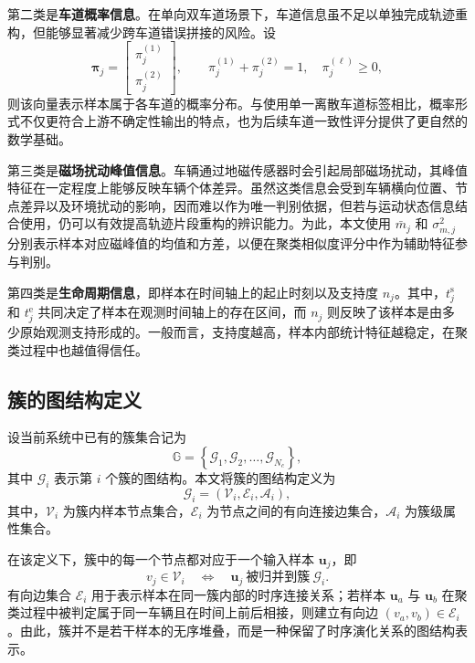 \documentclass{xdupgthesis}
\begin{document}
第二类是\textbf{车道概率信息}。在单向双车道场景下，车道信息虽不足以单独完成轨迹重构，但能够显著减少跨车道错误拼接的风险。设
\begin{equation}
	\boldsymbol{\pi}_j=
	\begin{bmatrix}
		\pi_j^{(1)}\\[2pt]
		\pi_j^{(2)}
	\end{bmatrix},
	\qquad
	\pi_j^{(1)}+\pi_j^{(2)}=1,\quad
	\pi_j^{(\ell)}\ge 0,
\end{equation}
则该向量表示样本属于各车道的概率分布。与使用单一离散车道标签相比，概率形式不仅更符合上游不确定性输出的特点，也为后续车道一致性评分提供了更自然的数学基础。

第三类是\textbf{磁场扰动峰值信息}。车辆通过地磁传感器时会引起局部磁场扰动，其峰值特征在一定程度上能够反映车辆个体差异。虽然这类信息会受到车辆横向位置、节点差异以及环境扰动的影响，因而难以作为唯一判别依据，但若与运动状态信息结合使用，仍可以有效提高轨迹片段重构的辨识能力。为此，本文使用 $\bar m_j$ 和 $\sigma_{m,j}^{2}$ 分别表示样本对应磁峰值的均值和方差，以便在聚类相似度评分中作为辅助特征参与判别。

第四类是\textbf{生命周期信息}，即样本在时间轴上的起止时刻以及支持度 $n_j$。其中，$t_j^{\mathrm{s}}$ 和 $t_j^{\mathrm{e}}$ 共同决定了样本在观测时间轴上的存在区间，而 $n_j$ 则反映了该样本是由多少原始观测支持形成的。一般而言，支持度越高，样本内部统计特征越稳定，在聚类过程中也越值得信任。

\subsection{簇的图结构定义}

设当前系统中已有的簇集合记为
\begin{equation}
	\mathbb{G}=\left\{\mathcal{G}_1,\mathcal{G}_2,\ldots,\mathcal{G}_{N_c}\right\},
\end{equation}
其中 $\mathcal{G}_i$ 表示第 $i$ 个簇的图结构。本文将簇的图结构定义为
\begin{equation}
	\mathcal{G}_i = \left(\mathcal{V}_i,\mathcal{E}_i,\mathcal{A}_i\right),
\end{equation}
其中，$\mathcal{V}_i$ 为簇内样本节点集合，$\mathcal{E}_i$ 为节点之间的有向连接边集合，$\mathcal{A}_i$ 为簇级属性集合。

在该定义下，簇中的每一个节点都对应于一个输入样本 $\mathbf{u}_j$，即
\begin{equation}
	v_j \in \mathcal{V}_i \quad \Longleftrightarrow \quad \mathbf{u}_j \ \text{被归并到簇}\ \mathcal{G}_i.
\end{equation}
有向边集合 $\mathcal{E}_i$ 用于表示样本在同一簇内部的时序连接关系；若样本 $\mathbf{u}_a$ 与 $\mathbf{u}_b$ 在聚类过程中被判定属于同一车辆且在时间上前后相接，则建立有向边 $(v_a,v_b)\in\mathcal{E}_i$。由此，簇并不是若干样本的无序堆叠，而是一种保留了时序演化关系的图结构表示。
\end{document}
